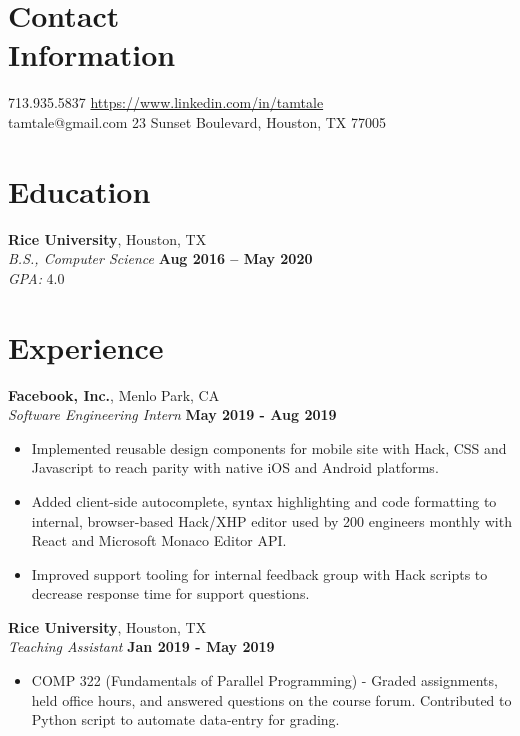 \documentclass[margin,line]{resume}
\begin{document}
\begin{resume}
    \section{\mysidestyle Contact\\Information}

    713.935.5837       \hfill \url{https://www.linkedin.com/in/tamtale
    } \\
    \noindent tamtale@gmail.com  \hfill
    23 Sunset Boulevard, Houston, TX 77005

    \section{\mysidestyle Education}

    \textbf{Rice University}, Houston, TX \vspace{1mm}\\
    \textsl{B.S., Computer Science} \hfill \textbf{Aug 2016 -- May 2020} \vspace{1mm}\\
    \textsl{GPA: } 4.0 

\section{\mysidestyle Experience}

\textbf{Facebook, Inc.}, Menlo Park, CA \vspace{2mm}\\\vspace{1mm}%
\textsl{Software Engineering Intern} \hfill \textbf{May 2019 - Aug 2019}
\begin{itemize}
    \item Implemented reusable design components for mobile site with Hack, CSS and Javascript to reach parity with native iOS and Android platforms.
    \item Added client-side autocomplete, syntax highlighting and code formatting to internal, browser-based Hack/XHP editor used by 200 engineers monthly with React and Microsoft Monaco Editor API.
    \item Improved support tooling for internal feedback group with Hack scripts to decrease response time for support questions. 
    
\end{itemize}

\textbf{Rice University}, Houston, TX \vspace{2mm}\\\vspace{1mm}%
\textsl{Teaching Assistant} \hfill \textbf{Jan 2019 - May 2019}
\begin{itemize}
    \item COMP 322 (Fundamentals of Parallel Programming) - Graded assignments, held office hours,
     and answered questions on the course forum.
     Contributed to Python script to automate data-entry for grading.
    

\end{itemize}
\end{resume}
\end{document}
